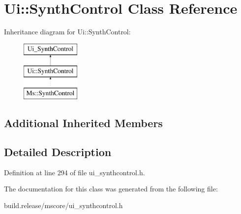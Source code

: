 \hypertarget{class_ui_1_1_synth_control}{}\section{Ui\+:\+:Synth\+Control Class Reference}
\label{class_ui_1_1_synth_control}
Inheritance diagram for Ui\+:\+:Synth\+Control\+:\begin{figure}[H]
\begin{center}
\leavevmode
\includegraphics[height=3.000000cm]{class_ui_1_1_synth_control}
\end{center}
\end{figure}
\subsection*{Additional Inherited Members}


\subsection{Detailed Description}


Definition at line 294 of file ui\+\_\+synthcontrol.\+h.



The documentation for this class was generated from the following file\+:\begin{DoxyCompactItemize}
\item 
build.\+release/mscore/ui\+\_\+synthcontrol.\+h\end{DoxyCompactItemize}
